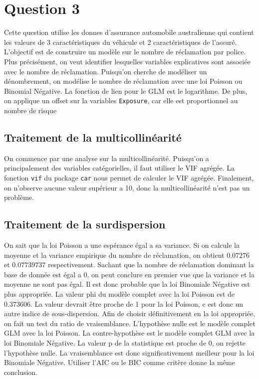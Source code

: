 \documentclass{article}
\begin{document}
	
\section{Question 3}
	Cette question utilise les donnes d'assurance automobile australienne qui contient les valeurs de 3 caractéristiques du véhicule et 2 caractéristiques de l'assuré. L'objectif est de construire un modèle sur le nombre de réclamation par police. Plus précisément, on veut identifier lesquelles variables explicatives sont associée avec le nombre de réclamation. Puisqu’on cherche de modéliser un dénombrement, on modélise le nombre de réclamation avec une loi Poisson ou Binomial Négative. La fonction de lien pour le GLM est le logarithme. De plus, on applique un offset sur la variables \texttt{Exposure}, car elle est proportionnel au nombre de risque
	
	\subsection{Traitement de la multicollinéarité}
	On commence par une analyse sur la multicollinéarité. Puisqu'on a principalement des variables catégorielles, il faut utiliser le VIF agrégée. La fonction \texttt{vif} du package \texttt{car} nous permet de calculer le VIF agrégée. Finalement, on n'observe aucune valeur supérieur a 10, donc la multicollinéarité n'est pas un problème. 
	
	\subsection{Traitement de la surdispersion}
	
	On sait que la loi Poisson a une espérance égal a sa variance. Si on calcule la moyenne et la variance empirique du nombre de réclamation, on obtient $0.07276$ et $0.07739737$ respectivement. Sachant que la nombre de réclamation dominant la base de donnée est égal a 0, on peut conclure en premier vue que la variance et la moyenne ne sont pas égal. Il est donc probable que la loi Binomiale Négative est plus appropriée. La valeur phi du modèle complet avec la loi Poisson est de $0.373606$. La valeur devrait être proche de 1 pour la loi Poisson, c est donc un autre indice de sous-dispersion. 
	Afin de choisir définitivement en la loi appropriée, on fait un test du ratio de vraisemblance. L'hypothèse nulle est le modèle complet GLM avec la loi Poisson. La contre-hypothèse est le modèle complet GLM avec la loi Binomiale Négative. La valeur p de la statistique est proche de 0, on rejette l'hypothèse nulle. La vraisemblance est donc significativement meilleur pour la loi Binomiale Négative. Utiliser l'AIC ou le BIC comme critère donne la même conclusion. 
	
\end{document}
